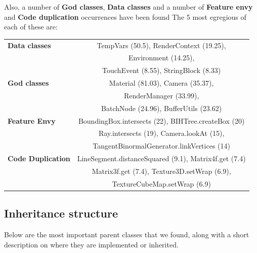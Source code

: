 \documentclass[a4paper, 10pt]{article}
\begin{document}

Also, a number of \textbf{God classes}, %
\textbf{Data classes} and a number of \textbf{Feature envy} and
\textbf{Code duplication} occurrences have been found
The 5 most egregious of each of these are:

\begin{tabular}{| l || c |}
  \hline
  \textbf{Data classes}     & TempVars (50.5), RenderContext (19.25), \\
                            & Environment (14.25), \\
                            & TouchEvent (8.55), StringBlock (8.33) \\
  \hline
  \textbf{God classes}      & Material (81.03), Camera (35.37), \\
                            & RenderManager (33.99), \\
                            & BatchNode (24.96), BufferUtils (23.62) \\
  \hline
  \textbf{Feature Envy}     & BoundingBox.intersects (22), BIHTree.createBox (20) \\
                            & Ray.intersects (19), Camera.lookAt (15), \\
                            & TangentBinormalGenerator.linkVertices (14) \\
  \hline
  \textbf{Code Duplication} & LineSegment.distanceSquared (9.1), Matrix4f.get (7.4) \\
                            & Matrix3f.get (7.4), Texture3D.setWrap (6.9), \\
                            & TextureCubeMap.setWrap (6.9) \\
  \hline
\end{tabular}


\subsection{Inheritance structure}
\label{sec:inheritance_structure}
Below are the most important parent classes that we found,
along with a short description on where they are implemented or inherited.
\end{document}
